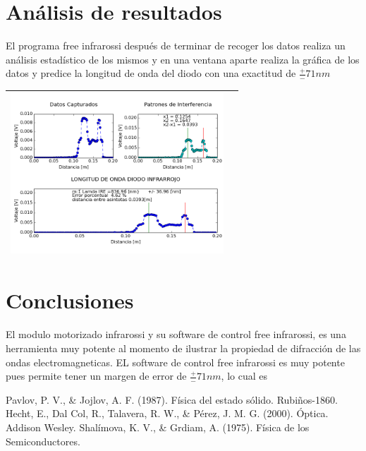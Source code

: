 \documentclass[12]{article}
\newenvironment{Figure}
{\par\medskip\noindent\minipage{\linewidth}}
{\endminipage\par\medskip}
\begin{document}
\begin{multicols}{2}
\section{Análisis de resultados}
El programa free infrarossi después de terminar de recoger los datos realiza un análisis estadístico de los mismos y en una ventana aparte realiza la gráfica de los datos y predice la longitud de onda del diodo con una exactitud de $\frac{+}{-} 71 nm$
\begin{Figure}	
\center
\begin{tabular}{|l|r|}
\hline
\includegraphics[width=8cm, height=6cm]{img/Graficas.png} \\ \hline
\end{tabular}
\label{fig:g1}
\end{Figure}

\section{Conclusiones}
El modulo motorizado infrarossi y su software de control free infrarossi,  es una herramienta muy potente al momento de ilustrar la propiedad de difracción de las ondas electromagneticas.
EL software de control free infrarossi es muy potente pues permite tener un margen de error de $\frac{+}{-}71 nm$, lo cual es 

\begin{thebibliography}{99}
 Pavlov, P. V., \& Jojlov, A. F. (1987). Física del estado sólido. Rubiños-1860.
 Hecht, E., Dal Col, R., Talavera, R. W., \& Pérez, J. M. G. (2000). Óptica. Addison Wesley.
 Shalímova, K. V., \& Grdiam, A. (1975). Física de los Semiconductores.


\end{thebibliography}
\end{multicols}
\end{document}

